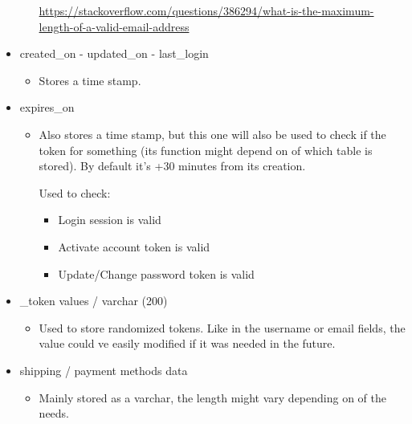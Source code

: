 \begin{flushleft}
\begin{itemize}
\begin{itemize}
            \begin{flushleft}
                \url{https://stackoverflow.com/questions/386294/what-is-the-maximum-length-of-a-valid-email-address}
            \end{flushleft}
        \end{itemize}
        \item created\_on - updated\_on - last\_login
        \begin{itemize}
            \item Stores a time stamp.
        \end{itemize}
        \item expires\_on
        \begin{itemize}

            \item Also stores a time stamp, but this one will also be used to check if the token for something (its function
            might depend on of which table is stored).
            By default  it's +30 minutes from its creation.
            \begin{flushleft}
            Used to check:
                \begin{itemize}
                    \item Login session is valid
                    \item Activate account token is valid
                    \item Update/Change password token is valid
                \end{itemize}
            \end{flushleft}
        \end{itemize}
        \item \_token values / varchar (200)
        \begin{itemize}
            \item Used to store randomized tokens.
            Like in the username or email fields, the value could ve easily modified if it was needed in the future.
        \end{itemize}
        \item shipping / payment methods data
        \begin{itemize}
            \item Mainly stored as a varchar, the length might vary depending on of the needs.
        \end{itemize}
    \end{itemize}
\end{flushleft}

